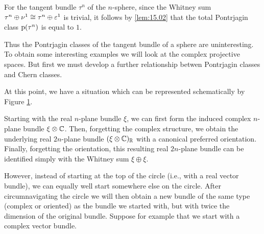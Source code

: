 \documentclass[../main]{subfiles}
\begin{document}
\begin{example}
For the tangent bundle $\tau^n$ of the $n$-sphere, since the Whitney sum $\tau^n \oplus \nu^1 \cong \tau^n \oplus \varepsilon^1$ is trivial, it follows by \ref{lem:15.02} that the total Pontrjagin class $\operatorname{p}(\tau^n)$ is equal to $1$.
\end{example}

Thus the Pontrjagin classes of the tangent bundle of a sphere are uninteresting. To obtain some interesting examples we will look at the complex projective spaces. But first we must develop a further relationship betwen Pontrjagin classes and Chern classes.

At this point, we have a situation which can be represented schematically by Figure \ref{fig:figure11}.

\begin{figure}[ht]
    \centering
    \caption{}
    \label{fig:figure11}
\end{figure}

Starting with the real $n$-plane bundle $\xi$, we can first form the induced complex $n$-plane bundle $\xi \otimes \mathbb C$. Then, forgetting the complex structure, we obtain the underlying real $2n$-plane bundle $(\xi \otimes \mathbb C)_\mathbb R$ with a canonical preferred orientation. Finally, forgetting the orientation, this resulting real $2n$-plane bundle can be identified simply with the Whitney sum $\xi \oplus \xi$.

However, instead of starting at the top of the circle (i.e., with a real vector bundle), we can equally well start somewhere else on the circle. After circumnavigating the circle we will then obtain a new bundle of the same type (complex or oriented) as the bundle we started with, but with twice the dimension of the original bundle. Suppose for example that we start with a complex vector bundle.
\end{document}
